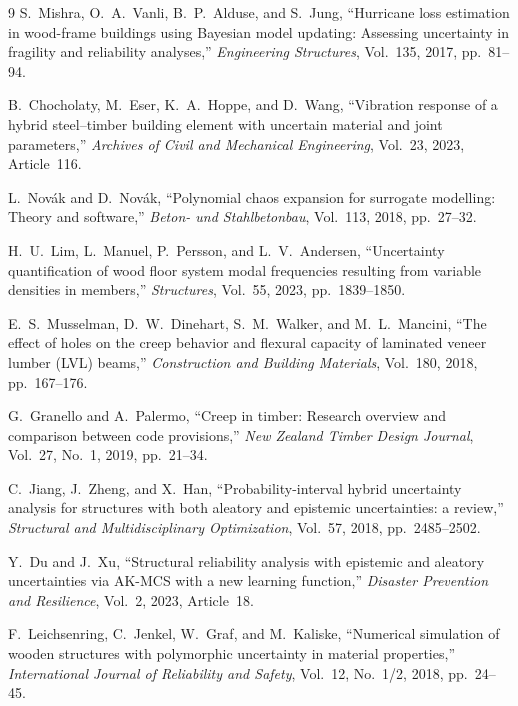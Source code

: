 \documentclass[10pt,twocolumn]{article}
\begin{document}
\begin{thebibliography}{9}
S.~Mishra, O.~A.~Vanli, B.~P.~Alduse, and S.~Jung,
``Hurricane loss estimation in wood-frame buildings using Bayesian model
  updating: Assessing uncertainty in fragility and reliability analyses,''
\textit{Engineering Structures}, Vol.~135, 2017, pp.~81--94.

B.~Chocholaty, M.~Eser, K.~A.~Hoppe, and D.~Wang,
``Vibration response of a hybrid steel--timber building element with
  uncertain material and joint parameters,''
\textit{Archives of Civil and Mechanical Engineering},
Vol.~23, 2023, Article~116.

L.~Nov\'{a}k and D.~Nov\'{a}k,
``Polynomial chaos expansion for surrogate modelling: Theory and software,''
\textit{Beton- und Stahlbetonbau}, Vol.~113, 2018, pp.~27--32.

H.~U.~Lim, L.~Manuel, P.~Persson, and L.~V.~Andersen,
``Uncertainty quantification of wood floor system modal frequencies
  resulting from variable densities in members,''
\textit{Structures}, Vol.~55, 2023, pp.~1839--1850.

E.~S.~Musselman, D.~W.~Dinehart, S.~M.~Walker, and M.~L.~Mancini,
``The effect of holes on the creep behavior and flexural capacity of
  laminated veneer lumber (LVL) beams,''
\textit{Construction and Building Materials}, Vol.~180, 2018,
pp.~167--176.

G.~Granello and A.~Palermo,
``Creep in timber: Research overview and comparison between code
  provisions,''
\textit{New Zealand Timber Design Journal}, Vol.~27, No.~1, 2019,
pp.~21--34.

C.~Jiang, J.~Zheng, and X.~Han,
``Probability-interval hybrid uncertainty analysis for structures with
  both aleatory and epistemic uncertainties: a review,''
\textit{Structural and Multidisciplinary Optimization},
Vol.~57, 2018, pp.~2485--2502.

Y.~Du and J.~Xu,
``Structural reliability analysis with epistemic and aleatory
  uncertainties via AK-MCS with a new learning function,''
\textit{Disaster Prevention and Resilience}, Vol.~2, 2023, Article~18.

F.~Leichsenring, C.~Jenkel, W.~Graf, and M.~Kaliske,
``Numerical simulation of wooden structures with polymorphic uncertainty
  in material properties,''
\textit{International Journal of Reliability and Safety},
Vol.~12, No.~1/2, 2018, pp.~24--45.


\end{thebibliography}
\end{document}

